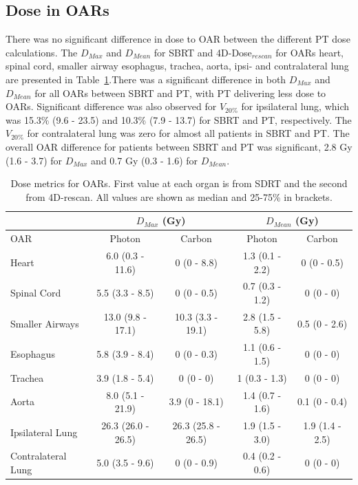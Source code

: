 \subsection{Dose in OARs}


There was no significant difference in dose to OAR between the different PT dose calculations. 
The $D_{Max}$ and $D_{Mean}$ for SBRT and 4D-Dose$_{rescan}$ for OARs heart, spinal cord, smaller airway esophagus, trachea, aorta, ipsi- and contralateral lung are 
presented in Table~\ref{tab:results}.There was a significant difference in both $D_{Max}$ and $D_{Mean}$ for all OARs between SBRT and PT, with 
PT delivering less dose to OARs. Significant difference was also observed for $V_{20\%}$ for ipsilateral lung, which was 15.3\% (9.6 - 23.5) and 10.3\% (7.9 - 13.7) for SBRT and PT, 
respectively. The $V_{20\%}$ for contralateral lung was zero for almost all patients in SBRT and PT. The overall OAR difference for patients between SBRT and PT 
was significant, 2.8 Gy (1.6 - 3.7)  for $D_{Max}$ and 0.7 Gy (0.3 - 1.6) for $D_{Mean}$. 



\begin{table}[H]
  \centering
  \caption{Dose metrics for OARs. First value at each organ is from SDRT and the second from 4D-rescan. All values are shown as median and 25-75\% in brackets.}
  \begin{tabular}{l|c|c|c|c|}
    \cline{2-5}
     & \multicolumn{2}{|c|}{$D_{Max}$ (Gy)} & \multicolumn{2}{|c|}{$D_{Mean}$ (Gy)} \\
     \hline
    \multicolumn{1}{|l|}{OAR} & Photon & Carbon & Photon & Carbon	\\
    \hline
\multicolumn{1}{|l|}{Heart} & 6.0 (0.3 - 11.6) & 0 (0 - 8.8)	& 1.3 (0.1 - 2.2) & 	0 (0 - 0.5) \\
\multicolumn{1}{|l|}{Spinal Cord} &	5.5 (3.3 - 8.5)	& 0 (0 - 0.5) &	0.7 (0.3 - 1.2) &	0 (0 - 0) \\
\multicolumn{1}{|l|}{Smaller Airways} & 13.0 (9.8 - 17.1) &	10.3 (3.3 - 19.1) &	2.8 (1.5 - 5.8) &	0.5 (0 - 2.6) \\
\multicolumn{1}{|l|}{Esophagus} & 5.8 (3.9 - 8.4) &	0 (0 - 0.3) &	1.1 (0.6 - 1.5) &	0 (0 - 0)\\
\multicolumn{1}{|l|}{Trachea} &3.9 (1.8 - 5.4) &	0 (0 - 0) &	1 (0.3 - 1.3) &	0 (0 - 0)\\
\multicolumn{1}{|l|}{Aorta} & 8.0 (5.1 - 21.9) &	3.9 (0 - 18.1) &	1.4 (0.7 - 1.6) &	0.1 (0 - 0.4)\\
\multicolumn{1}{|l|}{Ipsilateral Lung} & 26.3 (26.0 - 26.5) &	26.3 (25.8 - 26.5) &	1.9 (1.5 - 3.0) &	1.9 (1.4 - 2.5)\\
\multicolumn{1}{|l|}{Contralateral Lung} & 5.0 (3.5 - 9.6) &	0 (0 - 0.9) &	0.4 (0.2 - 0.6) &	0 (0 - 0) \\
    \hline\hline
  \end{tabular}
  \label{tab:results}
\end{table}




